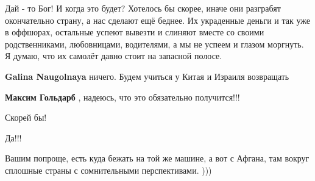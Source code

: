\begin{itemize}
Дай - то Бог! И когда это будет? Хотелось бы скорее, иначе они разграбят
окончательно страну, а нас сделают ещё беднее. Их украденные деньги и так уже в
оффшорах, остальные успеют вывезти и слиняют вместе со своими родственниками,
любовницами, водителями, а мы не успеем и глазом моргнуть. Я думаю, что их
самолёт давно стоит на запасной полосе.

\begin{itemize}
 
\textbf{Galina Naugolnaya} ничего. Будем учиться у Китая и Израиля возвращать

 
\textbf{Максим Гольдарб} , надеюсь, что это обязательно получится!!!
\end{itemize}

 
Скорей бы!

 
Да!!!

 
Вашим попроще, есть куда бежать на той же машине, а вот с Афгана, там вокруг сплошные страны с сомнительными перспективами. )))

\begin{itemize}
 

\end{itemize}
\end{itemize}
